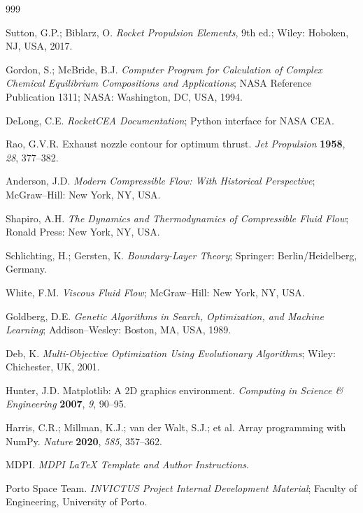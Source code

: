 \documentclass[journal,article,submit,oneauthor]{Definitions/mdpi}
\begin{document}
\begin{thebibliography}{999}

Sutton, G.P.; Biblarz, O. \textit{Rocket Propulsion Elements}, 9th ed.; Wiley: Hoboken, NJ, USA, 2017.

Gordon, S.; McBride, B.J. \textit{Computer Program for Calculation of Complex Chemical Equilibrium Compositions and Applications}; NASA Reference Publication 1311; NASA: Washington, DC, USA, 1994.

DeLong, C.E. \textit{RocketCEA Documentation}; Python interface for NASA CEA.

Rao, G.V.R. Exhaust nozzle contour for optimum thrust. \textit{Jet Propulsion} \textbf{1958}, \textit{28}, 377--382.

Anderson, J.D. \textit{Modern Compressible Flow: With Historical Perspective}; McGraw--Hill: New York, NY, USA.

Shapiro, A.H. \textit{The Dynamics and Thermodynamics of Compressible Fluid Flow}; Ronald Press: New York, NY, USA.

Schlichting, H.; Gersten, K. \textit{Boundary-Layer Theory}; Springer: Berlin/Heidelberg, Germany.

White, F.M. \textit{Viscous Fluid Flow}; McGraw--Hill: New York, NY, USA.

Goldberg, D.E. \textit{Genetic Algorithms in Search, Optimization, and Machine Learning}; Addison--Wesley: Boston, MA, USA, 1989.

Deb, K. \textit{Multi-Objective Optimization Using Evolutionary Algorithms}; Wiley: Chichester, UK, 2001.

Hunter, J.D. Matplotlib: A 2D graphics environment. \textit{Computing in Science \& Engineering} \textbf{2007}, \textit{9}, 90--95.

Harris, C.R.; Millman, K.J.; van der Walt, S.J.; et al. Array programming with NumPy. \textit{Nature} \textbf{2020}, \textit{585}, 357--362.

MDPI. \textit{MDPI LaTeX Template and Author Instructions}.

Porto Space Team. \textit{INVICTUS Project Internal Development Material}; Faculty of Engineering, University of Porto.


\end{thebibliography}
\end{document}
